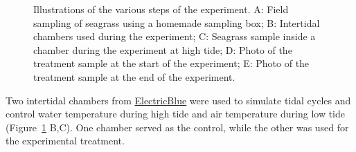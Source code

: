 \documentclass[
  number]{elsarticle}
\begin{document}
\label{cell-fig-design}
\begin{figure}[H]


\caption{\label{fig-design}Illustrations of the various steps of the
experiment. A: Field sampling of seagrass using a homemade sampling box;
B: Intertidal chambers used during the experiment; C: Seagrass sample
inside a chamber during the experiment at high tide; D: Photo of the
treatment sample at the start of the experiment; E: Photo of the
treatment sample at the end of the experiment.}

\end{figure}%

Two intertidal chambers from
\href{https://electricblue.eu/intertidal-chamber}{ElectricBlue} were
used to simulate tidal cycles and control water temperature during high
tide and air temperature during low tide (Figure~\ref{fig-design} B,C).
One chamber served as the control, while the other was used for the
experimental treatment.
\end{document}
